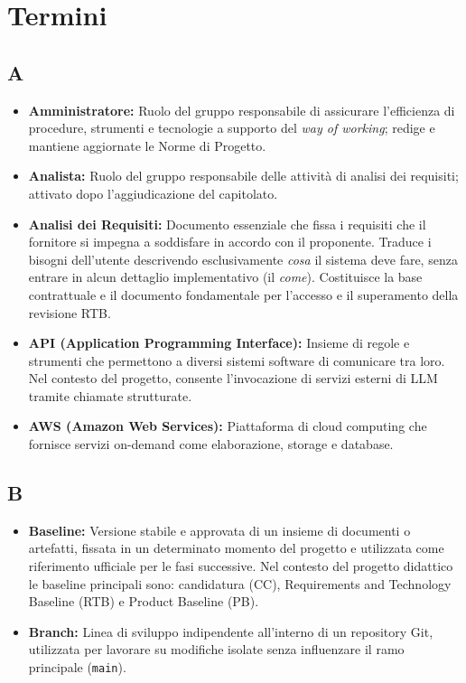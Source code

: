 \section{Termini}
 
{}
\subsection*{A}
\begin{itemize}[leftmargin=*]
    \item \textbf{Amministratore:} Ruolo del gruppo responsabile di assicurare
          l'efficienza di procedure, strumenti e tecnologie a supporto del
          \textit{way of working}; redige e mantiene aggiornate le Norme di
          Progetto.
    \item \textbf{Analista:} Ruolo del gruppo responsabile delle attività di
          analisi dei requisiti; attivato dopo l'aggiudicazione del capitolato.
      \item \textbf{Analisi dei Requisiti:} Documento essenziale che fissa i requisiti che il fornitore si impegna a soddisfare in accordo con il proponente. Traduce i bisogni dell'utente descrivendo esclusivamente \textit{cosa} il sistema deve fare, senza entrare in alcun dettaglio implementativo (il \textit{come}). Costituisce la base contrattuale e il documento fondamentale per l'accesso e il superamento della revisione RTB.
      \item \textbf{API (Application Programming Interface):} Insieme di regole e strumenti che permettono a diversi sistemi software di comunicare tra loro. Nel contesto del progetto, consente l'invocazione di servizi esterni di LLM tramite chiamate strutturate.
      \item \textbf{AWS (Amazon Web Services):} Piattaforma di cloud computing che fornisce servizi on-demand come elaborazione, storage e database.
      \end{itemize}
 
{}
\subsection*{B}
\begin{itemize}[leftmargin=*]
    \item \textbf{Baseline:} Versione stabile e approvata di un insieme di
          documenti o artefatti, fissata in un determinato momento del progetto
          e utilizzata come riferimento ufficiale per le fasi successive. Nel
          contesto del progetto didattico le baseline principali sono: candidatura
          (CC), Requirements and Technology Baseline (RTB) e Product Baseline (PB).
    \item \textbf{Branch:} Linea di sviluppo indipendente all'interno di un
          repository Git, utilizzata per lavorare su modifiche isolate senza
          influenzare il ramo principale (\texttt{main}).
\end{itemize}
 
